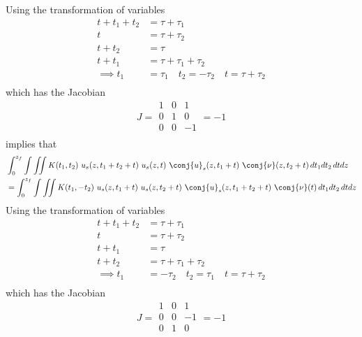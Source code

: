 Using the transformation of variables
\begin{equation}
\begin{split}
t + t_1 + t_2 &= \tau + \tau_1   \\
 t &= \tau + \tau_2 \\
 t + t_2 &= \tau   \\
 t + t_1 &= \tau + \tau_1 + \tau_2 \\
\implies t_1 &= \tau_1 \quad t_2 = -\tau_2 \quad  t = \tau + \tau_2 \\
\end{split}
\end{equation}
which has the Jacobian 
\begin{displaymath}
J = \begin{array}{|ccc|}
1 & 0 & 1 \\ 
0 & 1 & 0  \\ 
0 & 0 & -1 \\
\end{array} = -1
\end{displaymath}
implies that
\begin{equation}
 \begin{split}
&\int_{0}^{z_f} \int\iint K(t_1,t_2) \ u_s(z,t_1+t_2+t) \ u_s(z,t) \ \conj{u}_s(z,t_1+t) \ \conj{\nu}(z,t_2+t)\,dt_1 dt_2 \, dt dz \\
&=  \int_{0}^{z_f} \int \iint K(t_1,-t_2) \ u_s(z,t_1+t) \ u_s(z,t_2+t) \ \conj{u}_s(z,t_1+t_2+t) \ \conj{\nu}(t)  \,dt_1 dt_2  \, dt dz\\
\end{split}
\end{equation}
Using the transformation of variables
\begin{equation}
\begin{split}
t + t_1 + t_2 &= \tau + \tau_1   \\
 t &= \tau + \tau_2 \\
 t + t_1 &= \tau   \\
 t + t_2 &= \tau + \tau_1 + \tau_2 \\
\implies t_1 &= -\tau_2 \quad t_2 = \tau_1 \quad  t = \tau + \tau_2 \\
\end{split}
\end{equation}
which has the Jacobian 
\begin{displaymath}
J = \begin{array}{|ccc|}
1 & 0 & 1 \\ 
0 & 0 & -1  \\ 
0 & 1 & 0 \\
\end{array} = -1
\end{displaymath}
